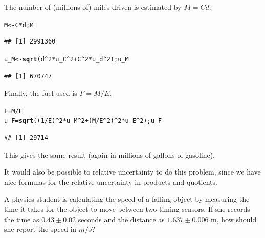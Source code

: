 \documentclass[twoside]{book}\usepackage[]{graphicx}\usepackage[]{xcolor}
\makeatletter
\newcommand{\hlnum}[1]{\textcolor[rgb]{0.686,0.059,0.569}{#1}}%
\newcommand{\hlopt}[1]{\textcolor[rgb]{0,0,0}{#1}}%
\newcommand{\hlstd}[1]{\textcolor[rgb]{0.345,0.345,0.345}{#1}}%
\newcommand{\hlkwb}[1]{\textcolor[rgb]{0.69,0.353,0.396}{#1}}%
\newcommand{\hlkwd}[1]{\textcolor[rgb]{0.737,0.353,0.396}{\textbf{#1}}}%
\newenvironment{kframe}{%
 \def\at@end@of@kframe{}%
 \ifinner\ifhmode%
  \def\at@end@of@kframe{\end{minipage}}%
  \begin{minipage}{\columnwidth}%
 \fi\fi%
 \def\FrameCommand##1{\hskip\@totalleftmargin \hskip-\fboxsep
 \colorbox{shadecolor}{##1}\hskip-\fboxsep
     \hskip-\linewidth \hskip-\@totalleftmargin \hskip\columnwidth}%
 \MakeFramed {\advance\hsize-\width
   \@totalleftmargin\z@ \linewidth\hsize
   \@setminipage}}%
 {\par\unskip\endMakeFramed%
 \at@end@of@kframe}
\newenvironment{knitrout}{}{} %
\makeatother
\begin{document}
\begin{solution}
The number of (millions of) miles driven is estimated by $M = C d$:
\begin{knitrout}
\color{fgcolor}\begin{kframe}
\begin{alltt}
\hlstd{M} \hlkwb{<-} \hlstd{C} \hlopt{*} \hlstd{d; M}
\end{alltt}
\begin{verbatim}
## [1] 2991360
\end{verbatim}
\begin{alltt}
\hlstd{u_M} \hlkwb{<-} \hlkwd{sqrt}\hlstd{( d}\hlopt{^}\hlnum{2} \hlopt{*} \hlstd{u_C}\hlopt{^}\hlnum{2} \hlopt{+} \hlstd{C}\hlopt{^}\hlnum{2} \hlopt{*} \hlstd{u_d}\hlopt{^}\hlnum{2}\hlstd{); u_M}
\end{alltt}
\begin{verbatim}
## [1] 670747
\end{verbatim}
\end{kframe}
\end{knitrout}

Finally, the fuel used is $F = M / E$.
\begin{knitrout}
\color{fgcolor}\begin{kframe}
\begin{alltt}
\hlstd{F} \hlkwb{=} \hlstd{M} \hlopt{/} \hlstd{E}
\hlstd{u_F} \hlkwb{=} \hlkwd{sqrt}\hlstd{( (}\hlnum{1}\hlopt{/}\hlstd{E)}\hlopt{^}\hlnum{2} \hlopt{*} \hlstd{u_M}\hlopt{^}\hlnum{2} \hlopt{+} \hlstd{(M}\hlopt{/}\hlstd{E}\hlopt{^}\hlnum{2}\hlstd{)}\hlopt{^}\hlnum{2} \hlopt{*} \hlstd{u_E}\hlopt{^}\hlnum{2}\hlstd{); u_F}
\end{alltt}
\begin{verbatim}
## [1] 29714
\end{verbatim}
\end{kframe}
\end{knitrout}

This gives the same result (again in millions of gallons of gasoline).

It would also be possible to relative uncertainty to do this problem, since 
we have nice formulas for the relative uncertainty in products and quotients.
\end{solution}

\begin{problem}
	\label{prob:speed-propagation}%
	A physics student is calculating the speed of a falling object by measuring the time
	it takes for the object to move between two timing sensors.
	If she records the time as $0.43 \pm 0.02$ seconds and the distance as 
	$1.637 \pm 0.006$ m, how should she report the speed in $m/s$?
\end{problem}
\end{document}
